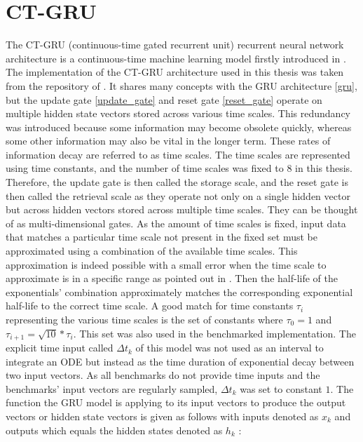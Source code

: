 \documentclass[draft,final]{vutinfth} %
\begin{document}
\section{CT-GRU} \label{ctgru}
The CT-GRU (continuous-time gated recurrent unit) recurrent neural network architecture is a continuous-time machine learning model firstly introduced in \cite{CTGRU}.
The implementation of the CT-GRU architecture used in this thesis was taken from the repository of \cite{ODELSTM}.
It shares many concepts with the GRU architecture \ref{gru}, but the update gate \ref{update_gate} and reset gate \ref{reset_gate} operate on multiple hidden state vectors stored across various time scales.
This redundancy was introduced because some information may become obsolete quickly, whereas some other information may also be vital in the longer term.
These rates of information decay are referred to as time scales.
The time scales are represented using time constants, and the number of time scales was fixed to $8$ in this thesis.
Therefore, the update gate is then called the storage scale, and the reset gate is then called the retrieval scale as they operate not only on a single hidden vector but across hidden vectors stored across multiple time scales.
They can be thought of as multi-dimensional gates.
As the amount of time scales is fixed, input data that matches a particular time scale not present in the fixed set must be approximated using a combination of the available time scales.
This approximation is indeed possible with a small error when the time scale to approximate is in a specific range as pointed out in \cite[p. 5-6]{CTGRU}.
Then the half-life of the exponentials' combination approximately matches the corresponding exponential half-life to the correct time scale.
A good match for time constants $\tau_i$ representing the various time scales is the set of constants where $\tau_0=1$ and $\tau_{i+1} = \sqrt{10} * \tau_{i}$.
This set was also used in the benchmarked implementation.
The explicit time input called $\Delta t_k$ of this model was not used as an interval to integrate an ODE but instead as the time duration of exponential decay between two input vectors.
As all benchmarks do not provide time inputs and the benchmarks' input vectors are regularly sampled, $\Delta t_k$ was set to constant $1$.
The function the GRU model is applying to its input vectors to produce the output vectors or hidden state vectors is given as follows with inputs denoted as $x_k$ and outputs which equals the hidden states denoted as $h_k$ \cite[p. 7]{CTGRU}:
\end{document}
